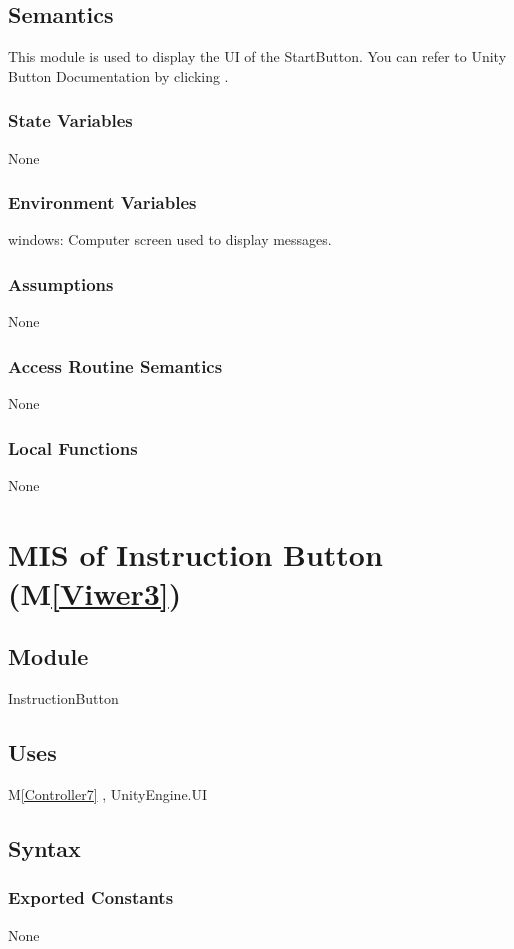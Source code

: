 \documentclass[12pt, titlepage]{article}
\newcommand{\mref}[1]{M\ref{#1}}
\begin{document}
\subsection{Semantics}
This module is used to display the UI of the StartButton. You can refer to Unity Button Documentation by clicking \bref.
\subsubsection{State Variables}
None
\subsubsection{Environment Variables}
windows: Computer screen used to display messages.
\subsubsection{Assumptions}
None
\subsubsection{Access Routine Semantics}
None
\subsubsection{Local Functions}
None


\newpage

\section{MIS of Instruction Button (\mref{Viwer3})}

\subsection{Module}
InstructionButton

\subsection{Uses}
\mref{Controller7}  , UnityEngine.UI

\subsection{Syntax}
\subsubsection{Exported Constants}
None
\end{document}
